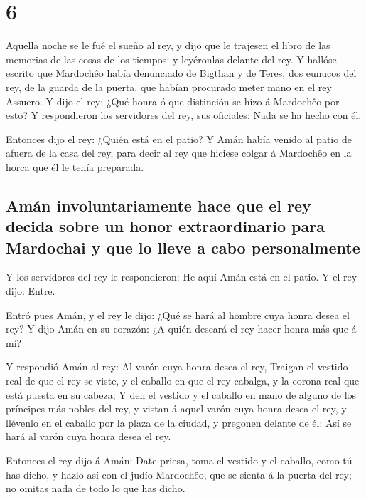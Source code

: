 \hypertarget{section-17-6}{%
\section{6}\label{section-17-6}}

 Aquella noche se le fué el sueño al rey, y dijo que le
trajesen el libro de las memorias de las cosas de los tiempos: y
leyéronlas delante del rey.  Y hallóse escrito que
Mardochêo había denunciado de Bigthan y de Teres, dos eunucos del rey,
de la guarda de la puerta, que habían procurado meter mano en el rey
Assuero.  Y dijo el rey: ¿Qué honra ó que distinción se
hizo á Mardochêo por esto? Y respondieron los servidores del rey, sus
oficiales: Nada se ha hecho con él.

 Entonces dijo el rey: ¿Quién está en el patio? Y Amán
había venido al patio de afuera de la casa del rey, para decir al rey
que hiciese colgar á Mardochêo en la horca que él le tenía preparada.

\hypertarget{amuxe1n-involuntariamente-hace-que-el-rey-decida-sobre-un-honor-extraordinario-para-mardochai-y-que-lo-lleve-a-cabo-personalmente}{%
\subsection{Amán involuntariamente hace que el rey decida sobre un honor
extraordinario para Mardochai y que lo lleve a cabo
personalmente}\label{amuxe1n-involuntariamente-hace-que-el-rey-decida-sobre-un-honor-extraordinario-para-mardochai-y-que-lo-lleve-a-cabo-personalmente}}

 Y los servidores del rey le respondieron: He aquí Amán
está en el patio. Y el rey dijo: Entre.

 Entró pues Amán, y el rey le dijo: ¿Qué se hará al hombre
cuya honra desea el rey? Y dijo Amán en su corazón: ¿A quién deseará el
rey hacer honra más que á mí?

 Y respondió Amán al rey: Al varón cuya honra desea el
rey,  Traigan el vestido real de que el rey se viste, y el
caballo en que el rey cabalga, y la corona real que está puesta en su
cabeza;  Y den el vestido y el caballo en mano de alguno
de los príncipes más nobles del rey, y vistan á aquel varón cuya honra
desea el rey, y llévenlo en el caballo por la plaza de la ciudad, y
pregonen delante de él: Así se hará al varón cuya honra desea el rey.

 Entonces el rey dijo á Amán: Date priesa, toma el
vestido y el caballo, como tú has dicho, y hazlo así con el judío
Mardochêo, que se sienta á la puerta del rey; no omitas nada de todo lo
que has dicho.

